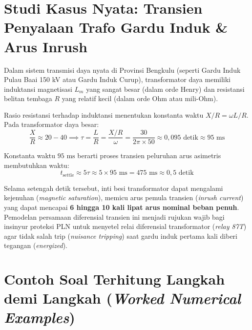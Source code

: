 \documentclass[11pt,a4paper]{article}
\theoremstyle{definition}
\begin{document}
\section{Studi Kasus Nyata: Transien Penyalaan Trafo Gardu Induk \& Arus Inrush}

Dalam sistem transmisi daya nyata di Provinsi Bengkulu (seperti Gardu Induk Pulau Baai 150 kV atau Gardu Induk Curup), transformator daya memiliki induktansi magnetisasi $L_m$ yang sangat besar (dalam orde Henry) dan resistansi belitan tembaga $R$ yang relatif kecil (dalam orde Ohm atau mili-Ohm).

Rasio resistansi terhadap induktansi menentukan konstanta waktu $X/R = \omega L / R$. Pada transformator daya besar:
\begin{equation}
    \frac{X}{R} \approx 20 - 40 \implies \tau = \frac{L}{R} = \frac{X/R}{\omega} = \frac{30}{2\pi \times 50} \approx 0{,}095\text{ detik} \approx 95\text{ ms}
\end{equation}

Konstanta waktu $95\text{ ms}$ berarti proses transien peluruhan arus asimetris membutuhkan waktu:
\begin{equation}
    t_{\text{settle}} \approx 5\tau \approx 5 \times 95\text{ ms} = 475\text{ ms} \approx 0{,}5\text{ detik}
\end{equation}

Selama setengah detik tersebut, inti besi transformator dapat mengalami kejenuhan (\textit{magnetic saturation}), memicu arus pemula transien (\textit{inrush current}) yang dapat mencapai \textbf{6 hingga 10 kali lipat arus nominal beban penuh}. Pemodelan persamaan diferensial transien ini menjadi rujukan wajib bagi insinyur proteksi PLN untuk menyetel relai diferensial transformator (\textit{relay 87T}) agar tidak salah trip (\textit{nuisance tripping}) saat gardu induk pertama kali diberi tegangan (\textit{energized}).


\section{Contoh Soal Terhitung Langkah demi Langkah (\textit{Worked Numerical Examples})}
\end{document}
